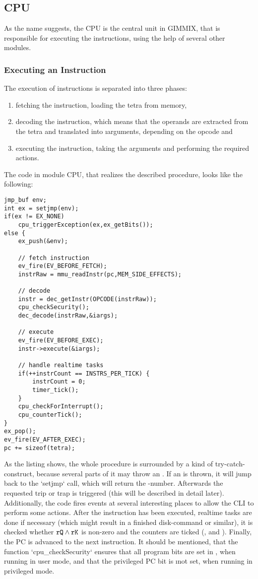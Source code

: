 \subsection{CPU}

As the name suggests, the CPU is the central unit in GIMMIX, that is responsible for executing the instructions, using the help of several other modules.

\subsubsection{Executing an Instruction}

The execution of instructions is separated into three phases:
\begin{enumerate}
	\item fetching the instruction, \ie loading the tetra from memory,
	\item decoding the instruction, which means that the operands are extracted from the tetra and translated into \i{arguments}, depending on the opcode and
	\item executing the instruction, taking the arguments and performing the required actions.
\end{enumerate}
The code in module CPU, that realizes the described procedure, looks like the following:
\begin{lstlisting}[language=GIMMIXC,caption=Executing an instruction (slightly shortened)]
jmp_buf env;
int ex = setjmp(env);
if(ex != EX_NONE)
	cpu_triggerException(ex,ex_getBits());
else {
	ex_push(&env);

	// fetch instruction
	ev_fire(EV_BEFORE_FETCH);
	instrRaw = mmu_readInstr(pc,MEM_SIDE_EFFECTS);

	// decode
	instr = dec_getInstr(OPCODE(instrRaw));
	cpu_checkSecurity();
	dec_decode(instrRaw,&iargs);

	// execute
	ev_fire(EV_BEFORE_EXEC);
	instr->execute(&iargs);

	// handle realtime tasks
	if(++instrCount == INSTRS_PER_TICK) {
		instrCount = 0;
		timer_tick();
	}
	cpu_checkForInterrupt();
	cpu_counterTick();
}
ex_pop();
ev_fire(EV_AFTER_EXEC);
pc += sizeof(tetra);
\end{lstlisting}
As the listing shows, the whole procedure is surrounded by a kind of try-catch-construct, because several parts of it may throw an . If an  is thrown, it will jump back to the `setjmp` call, which will return the -number. Afterwards the requested trip or trap is triggered (this will be described in detail later). Additionally, the code fires events at several interesting places to allow the CLI to perform some actions. After the instruction has been executed, realtime tasks are done if necessary (which might result in a finished disk-command or similar), it is checked whether ${\tt rQ}\land{\tt rK}$ is non-zero and the counters are ticked (,  and ). Finally, the \gls{PC} is advanced to the next instruction. It should be mentioned, that the function `cpu_checkSecurity` ensures that all program bits are set in , when running in user mode, and that the privileged \gls{PC} bit is \i{not} set, when running in privileged mode.

